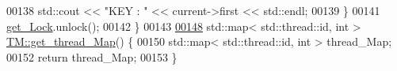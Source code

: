\begin{DoxyCode}
00138         std::cout << \textcolor{stringliteral}{"KEY : "} << current->first << std::endl;
00139     \}
00141     \hyperlink{class_t_m_a123bc5aa0766a7b909bebc54a429e5b0_a123bc5aa0766a7b909bebc54a429e5b0}{get\_Lock}.unlock();
00142 \}
00143 
\hypertarget{_t_m_8cpp_source.tex_l00148}{}\hyperlink{class_t_m_afb8bc9f42fe06c52747beb7f4c46915c_afb8bc9f42fe06c52747beb7f4c46915c}{00148} std::map< std::thread::id, int > \hyperlink{class_t_m_afb8bc9f42fe06c52747beb7f4c46915c_afb8bc9f42fe06c52747beb7f4c46915c}{TM::get\_thread\_Map}() \{
00150     std::map< std::thread::id, int > thread\_Map;
00152     \textcolor{keywordflow}{return} thread\_Map;
00153 \}
\end{DoxyCode}

